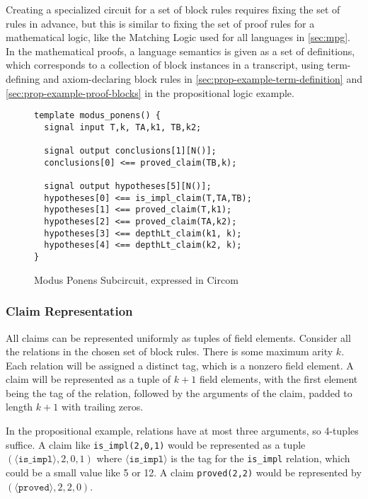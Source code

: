 \documentclass{article}
\theoremstyle{plain}
\theoremstyle{definition}
\begin{document}
Creating a specialized circuit for a set of block rules requires fixing the
set of rules in advance, but this is similar to fixing the set of proof
rules for a mathematical logic, like the Matching Logic used for all languages
in \cref{sec:mpg}.
In the mathematical proofs, a language semantics is given as a set of definitions,
which corresponds to a collection of block instances in a transcript, using
term-defining and axiom-declaring block rules in \cref{sec:prop-example-term-definition}
and \cref{sec:prop-example-proof-blocks} in the propositional logic example.

\begin{figure}
\begin{verbatim}
template modus_ponens() {
  signal input T,k, TA,k1, TB,k2;

  signal output conclusions[1][N()];
  conclusions[0] <== proved_claim(TB,k);

  signal output hypotheses[5][N()];
  hypotheses[0] <== is_impl_claim(T,TA,TB);
  hypotheses[1] <== proved_claim(T,k1);
  hypotheses[2] <== proved_claim(TA,k2);
  hypotheses[3] <== depthLt_claim(k1, k);
  hypotheses[4] <== depthLt_claim(k2, k);
}
\end{verbatim}
\caption{Modus Ponens Subcircuit, expressed in Circom}
\label{fig:modus_ponens_circom}
\end{figure}

\subsubsection{Claim Representation}

All claims can be represented uniformly as tuples of field elements.
Consider all the relations in the chosen set of block rules.
There is some maximum arity $k$.
Each relation will be assigned a distinct tag, which is a nonzero field element.
A claim will be represented as a tuple of $k+1$ field elements, with the
first element being the tag of the relation, followed by the arguments
of the claim, padded to length $k+1$ with trailing zeros.

In the propositional example, relations have at most three arguments,
so 4-tuples suffice. A claim like \texttt{is_impl(2,0,1)} would
be represented as a tuple $(\langle \texttt{is\_impl} \rangle, 2, 0 ,1)$
where $\langle \texttt{is\_impl} \rangle$ is the tag for the \texttt{is_impl}
relation, which could be a small value like 5 or 12.
A claim \texttt{proved(2,2)} would be represented by
$(\langle \texttt{proved} \rangle, 2, 2, 0)$.
\end{document}
